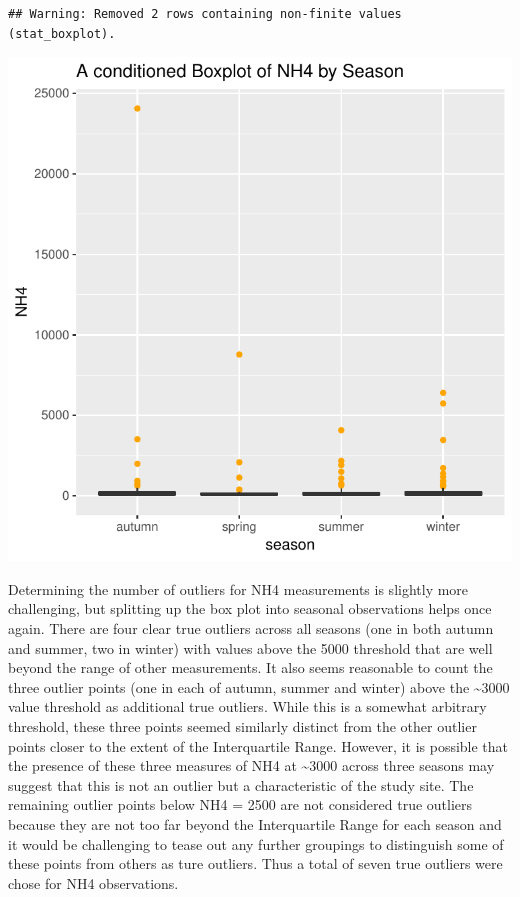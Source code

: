 \documentclass[]{article}
\begin{document}
\begin{verbatim}
## Warning: Removed 2 rows containing non-finite values (stat_boxplot).
\end{verbatim}

\begin{center}\includegraphics{homework1-handout_files/figure-latex/unnamed-chunk-3-2} \end{center}

Determining the number of outliers for NH4 measurements is slightly more
challenging, but splitting up the box plot into seasonal observations
helps once again. There are four clear true outliers across all seasons
(one in both autumn and summer, two in winter) with values above the
5000 threshold that are well beyond the range of other measurements. It
also seems reasonable to count the three outlier points (one in each of
autumn, summer and winter) above the \textasciitilde{}3000 value
threshold as additional true outliers. While this is a somewhat
arbitrary threshold, these three points seemed similarly distinct from
the other outlier points closer to the extent of the Interquartile
Range. However, it is possible that the presence of these three measures
of NH4 at \textasciitilde{}3000 across three seasons may suggest that
this is not an outlier but a characteristic of the study site. The
remaining outlier points below NH4 = 2500 are not considered true
outliers because they are not too far beyond the Interquartile Range for
each season and it would be challenging to tease out any further
groupings to distinguish some of these points from others as ture
outliers. Thus a total of seven true outliers were chose for NH4
observations.
\end{document}
